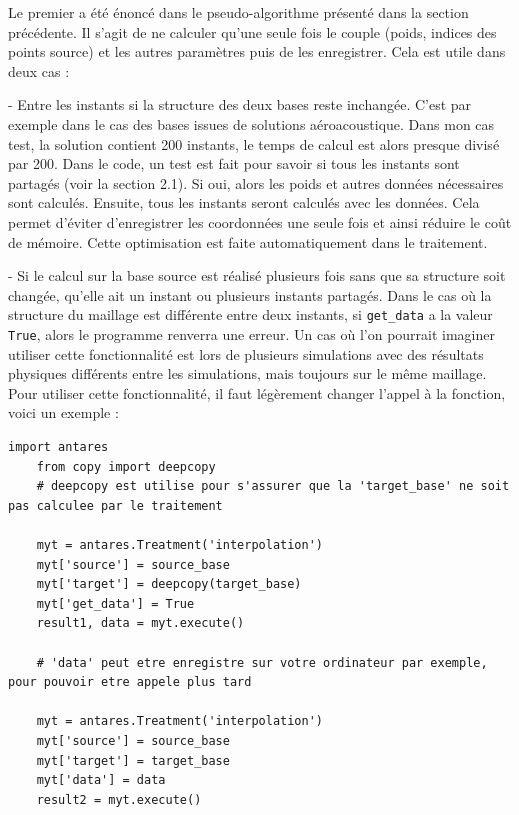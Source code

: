Le premier a été énoncé dans le pseudo-algorithme présenté dans la section précédente. Il s'agit de ne calculer qu'une seule fois le couple (poids, indices des points source) et les autres paramètres puis de les enregistrer. Cela est utile dans deux cas :

- Entre les instants si la structure des deux bases reste inchangée.
C'est par exemple dans le cas des bases issues de solutions aéroacoustique. Dans mon cas test, la solution contient 200 instants, le temps de calcul est alors presque divisé par 200. Dans le code, un test est fait pour savoir si tous les instants sont partagés (voir la section 2.1). Si oui, alors les poids et autres données nécessaires sont calculés. Ensuite, tous les instants seront calculés avec les données. Cela permet d'éviter d'enregistrer les coordonnées une seule fois et ainsi réduire le coût de mémoire.
Cette optimisation est faite automatiquement dans le traitement.

- Si le calcul sur la base source est réalisé plusieurs fois sans que sa structure soit changée, qu'elle ait un instant ou plusieurs instants partagés. Dans le cas où la structure du maillage est différente entre deux instants, si \texttt{get\_data} a la valeur \texttt{True}, alors le programme renverra une erreur.
Un cas où l'on pourrait imaginer utiliser cette fonctionnalité est lors de plusieurs simulations avec des résultats physiques différents entre les simulations, mais toujours sur le même maillage. Pour utiliser cette fonctionnalité, il faut légèrement changer l'appel à la fonction, voici un exemple :

\begin{lstlisting}[caption=Exemple de réutilisation des données, label={lst:antares}]
    import antares
    from copy import deepcopy
    # deepcopy est utilise pour s'assurer que la 'target_base' ne soit pas calculee par le traitement

    myt = antares.Treatment('interpolation')
    myt['source'] = source_base
    myt['target'] = deepcopy(target_base)
    myt['get_data'] = True
    result1, data = myt.execute()

    # 'data' peut etre enregistre sur votre ordinateur par exemple, pour pouvoir etre appele plus tard

    myt = antares.Treatment('interpolation')
    myt['source'] = source_base
    myt['target'] = target_base
    myt['data'] = data
    result2 = myt.execute()
\end{lstlisting}

